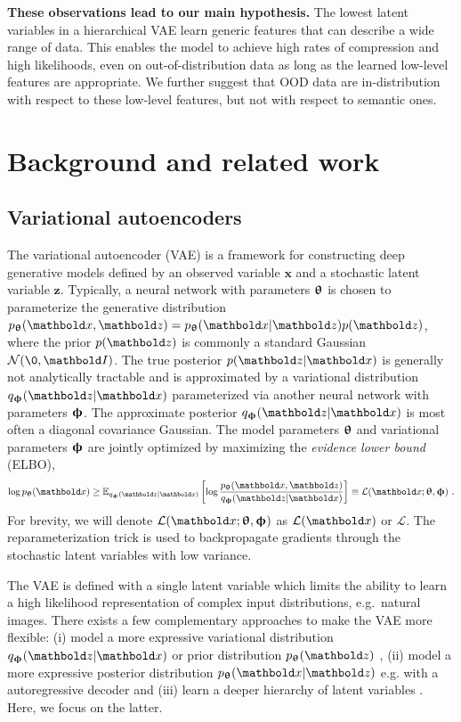 \textbf{These observations lead to our main hypothesis.}
The lowest latent variables in a hierarchical VAE learn generic features that can describe a wide range of data.
This enables the model to achieve high rates of compression and high likelihoods, even on out-of-distribution data as long as the learned low-level features are appropriate.
We further suggest that OOD data are in-distribution with respect to these low-level features, but not with respect to semantic ones.

\vspace{0cm}
\section{Background and related work}

\subsection{Variational autoencoders}
The variational autoencoder (VAE) \cite{kingma_autoencoding_2014, rezende_stochastic_2014} is a framework for constructing deep generative models defined by an observed variable $\mathbf{x}$ and a stochastic latent variable $\mathbf{z}$.
Typically, a neural network with parameters ${\boldsymbol{\uptheta}}$ is chosen to parameterize the generative distribution $p_\thetab(\xb,\zb)=p_\thetab(\xb|\zb)p(\zb)$, where the prior $p(\zb)$ is commonly a standard Gaussian $\mathcal{N}(\0, \Ib)$.
The true posterior $p(\zb|\xb)$ is generally not analytically tractable and is approximated by a variational distribution $q_\phib(\zb|\xb)$ parameterized via another neural network with parameters ${\boldsymbol{\upphi}}$. The approximate posterior $q_\phib(\zb|\xb)$ is most often  a diagonal covariance Gaussian.
The model parameters ${\boldsymbol{\uptheta}}$ and variational parameters ${\boldsymbol{\upphi}}$ are jointly optimized by maximizing the \textit{evidence lower bound} (ELBO),
\begin{equation}\label{eq:elbo}
    \log p_\thetab(\xb) \geq \mathbb{E}_{q_\phib(\zb|\xb)} \left[ \log \frac{p_\thetab(\xb,\zb)}{q_\phib(\zb|\xb)} \right] \equiv \mathcal{L}(\xb; \thetab, \phib)\ .
\end{equation}
For brevity, we will denote $\mathcal{L}(\xb; \thetab, \phib)$ as $\mathcal{L}(\xb)$ or $\mathcal{L}$. The reparameterization trick is used to backpropagate gradients through the stochastic latent variables with low variance.

The VAE is defined with a single latent variable which limits the ability to learn a high likelihood representation of complex input distributions, e.g.\ natural images.
There exists a few complementary approaches to make the VAE more flexible: (i) model a more expressive variational distribution $q_\phib(\zb|\xb)$ or prior distribution $p_\thetab(\zb)$ \cite{rezende_variational_2015, kingma_improved_2016}, (ii) model a more expressive posterior distribution $p_\thetab(\xb|\zb)$ e.g. with a autoregressive decoder \cite{oord_conditional_2016} and (iii) learn a deeper hierarchy of latent variables \cite{burda_importance_2016, sonderby_ladder_2016}.
Here, we focus on the latter.


